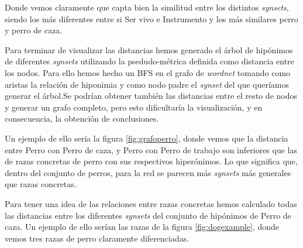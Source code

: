 \documentclass[12,twoside]{TFG-GM}
\theoremstyle{definition}
\theoremstyle{remark}
\begin{document}
Donde vemos claramente que capta bien la similitud entre los distintos \textit{synsets}, siendo los más diferentes entre si Ser vivo e Instrumento y los más similares perro y perro de caza. 

Para terminar de visualizar las distancias hemos generado el árbol de hipónimos de diferentes \textit{synsets} utilizando la psedudo-métrica definida como distancia entre los nodos. Para ello hemos hecho un BFS en el grafo de \textit{wordnet} tomando como aristas la relación de hiponimia y como nodo padre el \textit{synset} del que queríamos generar el árbol.Se podrían obtener también las distancias entre el resto de nodos y generar un grafo completo, pero esto dificultaría la visualización, y en consecuencia, la obtención de conclusiones. 

Un ejemplo de ello sería la figura \ref{fig:grafoperro}, donde vemos que la distancia entre Perro con Perro de caza, y Perro con Perro de trabajo son inferiores que las de razas concretas de perro con sus respectivos hiperónimos. Lo que significa que, dentro del conjunto de perros, para la red se parecen más \textit{synsets} más generales que razas concretas.


Para tener una idea de las relaciones entre razas concretas hemos calculado todas las distancias entre los diferentes \textit{synsets} del conjunto de hipónimos de Perro de caza. Un ejemplo de ello serían las razas de la figura \ref{fig:dogexample}, donde vemos tres razas de perro claramente diferenciadas. 
\end{document}
